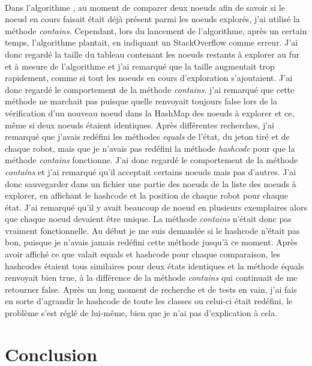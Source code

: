 \documentclass[a4paper, 12pt]{article}
\begin{document}
    \paragraph{}
    Dans l'algorithme , au moment de comparer deux noeuds afin de savoir si le noeud en cours faisait était déjà présent parmi les noeuds explorés, j'ai utilisé la méthode \textit{contains}.
    Cependant, lors du lancement de l'algorithme, après un certain temps, l'algorithme plantait, en indiquant un StackOverflow comme erreur. J'ai donc regardé la taille du tableau contenant les noeuds restants à explorer au fur et à mesure de l'algorithme et j'ai remarqué que la taille augmentait trop rapidement, comme si tout les noeuds en cours d'exploration s'ajoutaient. J'ai donc regardé le comportement de la méthode \textit{contains}. j'ai remarqué que cette méthode ne marchait pas puisque quelle renvoyait toujours false lors de la vérification d'un nouveau noeud dans la HashMap des noeuds à explorer et ce, même si deux noeuds étaient identiques. Après différentes recherches, j'ai remarqué que j'avais redéfini les méthodes \textit{equals} de l'état, du jeton tiré et de chaque robot, mais que je n'avais pas redéfini la méthode \textit{hashcode} pour que la méthode \textit{contains} fonctionne. J'ai donc regardé le comportement de la méthode \textit{contains} et j'ai remarqué qu'il acceptait certains noeuds mais pas d'autres. J'ai donc sauvegarder dans un fichier une partie des noeuds de la liste des noeuds à explorer, en affichant le hashcode et la position de chaque robot pour chaque état. J'ai remarqué qu'il y avait beaucoup de noeud en plusieurs exemplaires alors que chaque noeud devaient être unique. La méthode \textit{contains} n'était donc pas vraiment fonctionnelle. Au début je me suis demandée si le hashcode n'était pas bon, puisque je n'avais jamais redéfini cette méthode jusqu'à ce moment. Après avoir affiché ce que valait equals et hashcode pour chaque comparaison, les hashcodes étaient tous similaires pour deux états identiques et la méthode équals renvoyait bien true, à la différence de la méthode \textit{contains} qui continuait de me retourner false. Après un long moment de recherche et de tests en vain, j'ai fais en sorte d'agrandir le hashcode de toute les classes ou celui-ci était redéfini, le problème s'est réglé de lui-même, bien que je n'ai pas d'explication à cela.
\newpage %

\section{Conclusion}
\end{document}
